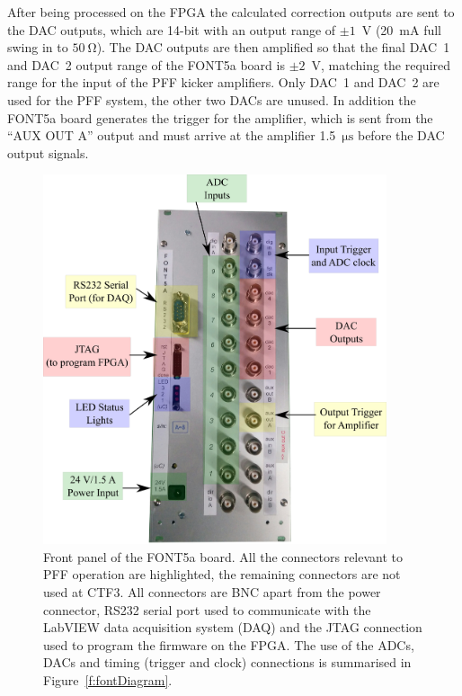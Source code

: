 After being processed on the FPGA the calculated correction outputs are sent to the DAC outputs, which are 14-bit with an output range of \(\pm1\)~V (20~mA full swing in to \(50~\mathrm{\Omega}\)). The DAC outputs are then amplified so that the final DAC~1 and DAC~2 output range of the FONT5a board is \(\pm 2\)~V,  matching the required range for the input of the PFF kicker amplifiers. Only DAC~1 and DAC~2 are used for the PFF system, the other two DACs are unused. In addition the FONT5a board generates the trigger for the amplifier, which is sent from the ``AUX OUT A'' output and must arrive at the amplifier 1.5~\(\mathrm{\mu s}\) before the DAC output signals.

\begin{figure}
  \centering
  \includegraphics[width=0.9\textwidth]{Figures/commissioning/FONT5aPanelPic}
  \caption{Front panel of the FONT5a board. All the connectors relevant to PFF operation are highlighted, the remaining connectors are not used at CTF3. All connectors are BNC apart from the power connector, RS232 serial port used to communicate with the LabVIEW data acquisition system (DAQ) and the JTAG connection used to program the firmware on the FPGA. The use of the ADCs, DACs and timing (trigger and clock) connections is summarised in Figure~\ref{f:fontDiagram}. }
  \label{f:FONT5aPanelPic}
\end{figure}

